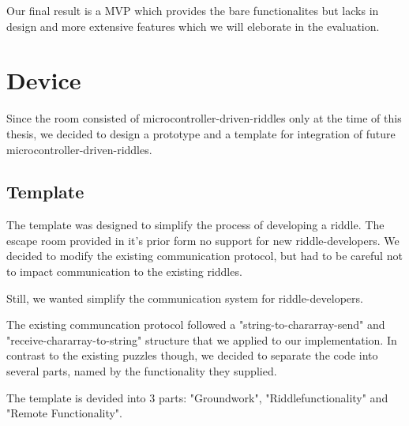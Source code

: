 Our final result is a MVP %
which provides the bare functionalites but lacks in design and more extensive features which we will eleborate in the evaluation.
\section{Device}
Since the room consisted of microcontroller-driven-riddles only at the time of this thesis, we decided to design a prototype and a template for integration of future microcontroller-driven-riddles.

\subsection{Template}

The template was designed to simplify the process of developing a riddle.
The escape room provided in it's prior form no support for new riddle-developers. 
We decided to modify the existing communication protocol, but had to be careful not to impact communication to the existing riddles.

Still, we wanted simplify the communication system for riddle-developers. 

The existing communcation protocol followed a "string-to-chararray-send" and "receive-chararray-to-string" structure that we applied to our implementation.
In contrast to the existing puzzles though, we decided to separate the code into several parts, named by the functionality they supplied. 

The template is devided into 3 parts: "Groundwork", "Riddlefunctionality" and "Remote Functionality". 

